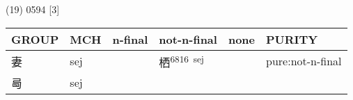 \documentclass[14pt,a4paper]{scrartcl}
\begin{document}
(19) 0594 {[}3{]}

\begin{longtable}[c]{@{}llllll@{}}
\toprule
\begin{minipage}[b]{0.14\columnwidth}\raggedright\strut
GROUP
\strut\end{minipage} &
\begin{minipage}[b]{0.14\columnwidth}\raggedright\strut
MCH
\strut\end{minipage} &
\begin{minipage}[b]{0.14\columnwidth}\raggedright\strut
n-final
\strut\end{minipage} &
\begin{minipage}[b]{0.14\columnwidth}\raggedright\strut
not-n-final
\strut\end{minipage} &
\begin{minipage}[b]{0.14\columnwidth}\raggedright\strut
none
\strut\end{minipage} &
\begin{minipage}[b]{0.14\columnwidth}\raggedright\strut
PURITY
\strut\end{minipage}\tabularnewline
\midrule
\endhead
\begin{minipage}[t]{0.14\columnwidth}\raggedright\strut
妻
\strut\end{minipage} &
\begin{minipage}[t]{0.14\columnwidth}\raggedright\strut
sej
\strut\end{minipage} &
\begin{minipage}[t]{0.14\columnwidth}\raggedright\strut
\strut\end{minipage} &
\begin{minipage}[t]{0.14\columnwidth}\raggedright\strut
栖\textsuperscript{6816~sej}
\strut\end{minipage} &
\begin{minipage}[t]{0.14\columnwidth}\raggedright\strut
\strut\end{minipage} &
\begin{minipage}[t]{0.14\columnwidth}\raggedright\strut
pure:not-n-final
\strut\end{minipage}\tabularnewline
\begin{minipage}[t]{0.14\columnwidth}\raggedright\strut
㢴
\strut\end{minipage} &
\begin{minipage}[t]{0.14\columnwidth}\raggedright\strut
sej
\strut\end{minipage} &
\begin{minipage}[t]{0.14\columnwidth}\raggedright\strut

\end{minipage}
\end{longtable}
\end{document}
